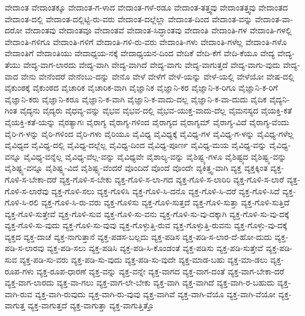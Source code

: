 {ವೇದಾಂತ
ವೇದಾಂತಕ್ಕೂ
ವೇದಾಂತ-ಗ-ಳಾದ
ವೇದಾಂತ-ಗಳೆ-ರಡೂ
ವೇದಾಂತ-ತತ್ತ್ವವು
ವೇದಾಂತತ್ತ್ವವು
ವೇದಾಂತದ
ವೇದಾಂತ-ದಲ್ಲಿ
ವೇದಾಂತ-ದಲ್ಲಿಟ್ಟಿ-ರು-ವರು
ವೇದಾಂತ-ದಲ್ಲೆಲ್ಲಾ
ವೇದಾಂತ-ದಿಂದ
ವೇದಾಂತ-ವನ್ನು
ವೇದಾಂತ-ವಾ-ದರೋ
ವೇದಾಂತವು
ವೇದಾಂತವೂ
ವೇದಾಂತವೆ
ವೇದಾಂತ-ಸಿದ್ಧಾಂತವು
ವೇದಾಂತಿ
ವೇದಾಂತಿ-ಗಳ
ವೇದಾಂತಿ-ಗಳಲ್ಲಿ
ವೇದಾಂತಿ-ಗಳಿಗೂ
ವೇದಾಂತಿ-ಗಳಿಗೆ
ವೇದಾಂತಿ-ಗಳಿ-ರು-ವರು
ವೇದಾಂತಿ-ಗಳು
ವೇದಾಂತಿ-ಗಳೆಲ್ಲ
ವೇದಾಂತಿ-ಗಳೊ
ವೇದಾಂತಿಗೆ
ವೇದಾಂತಿಯು
ವೇದಾಧ್ಯಯ-ನಕ್ಕೆ
ವೇದಾಧ್ಯಯನ-ದಿಂದ
ವೇದಿಕೆ
ವೇದಿ-ಕೆಗೆ
ವೇದಿ-ಕೆಯೂ
ವೇದ್ಯ
ವೇದ್ಯ-ತೆಯು
ವೇದ್ಯ-ವಾಗ-ಲಾರದು
ವೇದ್ಯ-ವಾಗಿ
ವೇದ್ಯ-ವಾಗಿದೆ
ವೇದ್ಯ-ವಾಗು
ವೇದ್ಯ-ವಾಗುತ್ತದೆ
ವೇದ್ಯ-ವಾಗು-ವುದು
ವೇದ್ಯ-ವಾದ
ವೇನು
ವೇನೆಂದರೆ
ವೇನೆಂಬು-ದನ್ನು
ವೇನೊ
ವೇಳೆ
ವೇಳೆಗೆ
ವೇಳೆ-ಯನ್ನು
ವೇಳೆ-ಯಲ್ಲಿ
ವೇಳೆಯೋ
ವೇಷ-ದಲ್ಲಿ
ವೈಕುಂಠಕ್ಕೆ
ವೈಕುಂಠದ
ವೈಚಾರಿಕ
ವೈಚಾರಿಕ-ವಾಗಿ
ವೈಜ್ಞಾನಿಕ
ವೈಜ್ಞಾನಿ-ಕರ
ವೈಜ್ಞಾನಿ-ಕ-ರಿಗೂ
ವೈಜ್ಞಾನಿ-ಕ-ರಿಗೆ
ವೈಜ್ಞಾನಿ-ಕರು
ವೈಜ್ಞಾನಿ-ಕರೂ
ವೈಜ್ಞಾನಿ-ಕ-ವಾಗಿ
ವೈಜ್ಞಾನಿ-ಕ-ವಾದು-ದಲ್ಲ
ವೈಜ್ಞಾನಿ-ಕ-ವಾ-ದುದು
ವೈದಿಕ
ವೈದ್ಯನಿ-ಗಿಂತ
ವೈದ್ಯನು
ವೈದ್ಯರು
ವೈಧವ್ಯ-ವನ್ನು
ವೈಭವ
ವೈಭವ-ದಲ್ಲಿ
ವೈಭವ-ಯುಕ್ತ-ವಾದು-ದೆಲ್ಲ
ವೈಮನಸ್ಯದ
ವೈಯಕ್ತಿ-ಕತೆ
ವೈಯಕ್ತಿ-ಕತೆ-ಯನ್ನು
ವೈರತ್ಯಾಗಃ
ವೈರಾಗ್ಯ
ವೈರಾಗ್ಯ-ಗಳಿಂದ
ವೈರಾಗ್ಯದ
ವೈರಾಗ್ಯಮ್
ವೈರಾಗ್ಯ-ವಿದೆ
ವೈರಾಗ್ಯ-ವೆಂದು
ವೈರಿ-ಗ-ಳನ್ನು
ವೈರಿ-ಗಳಿಂದ
ವೈರಿ-ಗಳು
ವೈರಿಯೂ
ವೈವಿಧ್ಯ
ವೈವಿಧ್ಯಕ್ಕೆ
ವೈವಿಧ್ಯ-ಗಳ
ವೈವಿಧ್ಯ-ಗ-ಳನ್ನು
ವೈವಿಧ್ಯ-ಗಳೆಲ್ಲ
ವೈವಿಧ್ಯದ
ವೈವಿಧ್ಯ-ದಲ್ಲಿ
ವೈವಿಧ್ಯ-ದಲ್ಲೆಲ್ಲ
ವೈವಿಧ್ಯ-ದಿಂದ
ವೈವಿಧ್ಯ-ಪೂರ್ಣ
ವೈವಿಧ್ಯ-ಮಯ
ವೈವಿಧ್ಯ-ವನ್ನು
ವೈವಿಧ್ಯ-ವನ್ನೂ
ವೈವಿಧ್ಯ-ವನ್ನೆಲ್ಲ
ವೈವಿಧ್ಯ-ವೆಲ್ಲ-ವನ್ನು
ವೈವಿಧ್ಯವೇ
ವೈಶಾಲ್ಯ-ವನ್ನು
ವೈಶಿಷ್ಟ್ಯ-ಗಳೂ
ವೈಶಿಷ್ಟ್ಯದ
ವೈಶಿಷ್ಟ್ಯ-ವನ್ನು
ವೈಶಿಷ್ಟ್ಯ-ವನ್ನೂ
ವೈಶಿಷ್ಟ್ಯ-ವಿದೆ
ವೈಶಿಷ್ಟ್ಯ-ವೆಂದರೆ
ವೊಂದಿದೆ
ವೊಂದೆ
ವೊಂದೇ
ವ್ಯಕಿತ್ತ್ವ-ವಾಗಿ
ವ್ಯಕ್ತ
ವ್ಯಕ್ತಕ್ಕಿಂತ
ವ್ಯಕ್ತ-ಗೊಳಿ-ಸ-ಬೇಕಾ-ದರೆ
ವ್ಯಕ್ತ-ಗೊಳಿ-ಸ-ಬೇಕು
ವ್ಯಕ್ತ-ಗೊಳಿ-ಸ-ಲಾ-ಗದ
ವ್ಯಕ್ತ-ಗೊಳಿ-ಸ-ಲಾರಿರಿ
ವ್ಯಕ್ತ-ಗೊಳಿ-ಸ-ಲಾರೆ
ವ್ಯಕ್ತ-ಗೊಳಿ-ಸ-ಲಾರೆವು
ವ್ಯಕ್ತ-ಗೊಳಿ-ಸಲು
ವ್ಯಕ್ತ-ಗೊಳಿಸಿ
ವ್ಯಕ್ತ-ಗೊಳಿ-ಸಿ-ದನೊ
ವ್ಯಕ್ತ-ಗೊಳಿ-ಸಿ-ದರೆ
ವ್ಯಕ್ತ-ಗೊಳಿ-ಸಿದೆ
ವ್ಯಕ್ತ-ಗೊಳಿ-ಸಿ-ರಲಿ
ವ್ಯಕ್ತ-ಗೊಳಿ-ಸಿ-ರು-ವರು
ವ್ಯಕ್ತ-ಗೊಳಿಸು
ವ್ಯಕ್ತ-ಗೊಳಿ-ಸುತ್ತದೆ
ವ್ಯಕ್ತ-ಗೊಳಿ-ಸುತ್ತಾ
ವ್ಯಕ್ತ-ಗೊಳಿ-ಸುತ್ತಿದೆ
ವ್ಯಕ್ತ-ಗೊಳಿ-ಸುತ್ತೇವೆ
ವ್ಯಕ್ತ-ಗೊಳಿ-ಸುವ
ವ್ಯಕ್ತ-ಗೊಳಿ-ಸು-ವನು
ವ್ಯಕ್ತ-ಗೊಳಿ-ಸು-ವು-ದಕ್ಕಾಗಿ
ವ್ಯಕ್ತ-ಗೊಳಿ-ಸು-ವು-ದಕ್ಕೆ
ವ್ಯಕ್ತ-ಗೊಳಿ-ಸು-ವುದು
ವ್ಯಕ್ತ-ಗೊಳಿ-ಸು-ವುವು
ವ್ಯಕ್ತ-ಗೊಳ್ಳುತ್ತಿ-ರುವ
ವ್ಯಕ್ತ-ಗೊಳ್ಳುತ್ತಿ-ರುವನು
ವ್ಯಕ್ತ-ಗೊಳ್ಳು-ವು-ದಕ್ಕೆ
ವ್ಯಕ್ತದ
ವ್ಯಕ್ತ-ದಾಚೆ
ವ್ಯಕ್ತ-ನಾಗುತ್ತಾನೆ
ವ್ಯಕ್ತ-ಪಡಸ-ಬಲ್ಲದು
ವ್ಯಕ್ತ-ಪಡಿಸ
ವ್ಯಕ್ತ-ಪಡಿ-ಸ-ಲಾರ-ದೆ-ಹೋ-ದುದು
ವ್ಯಕ್ತ-ಪಡಿ-ಸ-ಲಾರವು
ವ್ಯಕ್ತ-ಪಡಿ-ಸಲು
ವ್ಯಕ್ತ-ಪಡಿಸಿ
ವ್ಯಕ್ತ-ಪಡಿ-ಸಿ-ಕೊಂಡಂತೆ
ವ್ಯಕ್ತ-ಪಡಿಸು
ವ್ಯಕ್ತ-ಪಡಿ-ಸುತ್ತೇವೆ
ವ್ಯಕ್ತ-ಪಡಿ-ಸುವ
ವ್ಯಕ್ತ-ಪಡಿ-ಸು-ವರು
ವ್ಯಕ್ತ-ಪಡಿ-ಸು-ವುದು
ವ್ಯಕ್ತ-ಪಡಿ-ಸು-ವುದೇ
ವ್ಯಕ್ತ-ಮಾಡ-ಬಹು
ವ್ಯಕ್ತ-ಮಾ-ಡಲು
ವ್ಯಕ್ತ-ರೂಪ-ಗಳು
ವ್ಯಕ್ತ-ರೂಪ-ಧಾರಣೆ
ವ್ಯಕ್ತ-ವನ್ನು
ವ್ಯಕ್ತ-ವನ್ನೇ
ವ್ಯಕ್ತ-ವಾಗದ
ವ್ಯಕ್ತ-ವಾಗ-ದಂತೆ
ವ್ಯಕ್ತ-ವಾಗ-ಬೇಕಾ-ದರೆ
ವ್ಯಕ್ತ-ವಾಗ-ಲಾರದು
ವ್ಯಕ್ತ-ವಾ-ಗಲು
ವ್ಯಕ್ತ-ವಾಗ-ಲೇ-ಬೇಕು
ವ್ಯಕ್ತ-ವಾಗಿ
ವ್ಯಕ್ತ-ವಾಗಿದೆ
ವ್ಯಕ್ತ-ವಾಗಿ-ರ-ಬಹುದು
ವ್ಯಕ್ತ-ವಾಗಿ-ರುವ
ವ್ಯಕ್ತ-ವಾಗಿ-ರುವುದು
ವ್ಯಕ್ತ-ವಾಗಿ-ರು-ವುವು
ವ್ಯಕ್ತ-ವಾಗಿವೆ
ವ್ಯಕ್ತ-ವಾಗಿ-ವೆಯೊ
ವ್ಯಕ್ತ-ವಾಗಿ-ವೆಯೋ
ವ್ಯಕ್ತ-ವಾಗುತ್ತ
ವ್ಯಕ್ತ-ವಾಗುತ್ತದೆ
ವ್ಯಕ್ತ-ವಾಗುತ್ತಾ
ವ್ಯಕ್ತ-ವಾಗುತ್ತಿತ್ತೊ
}
